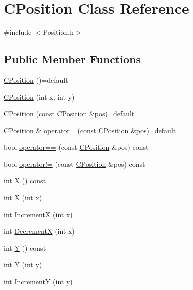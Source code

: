 \hypertarget{classCPosition}{}\section{C\+Position Class Reference}
\label{classCPosition}


{\ttfamily \#include $<$Position.\+h$>$}

\subsection*{Public Member Functions}
\begin{DoxyCompactItemize}
\item 
\hyperlink{classCPosition_a0286273b62fb1419e0e358eb4c352458}{C\+Position} ()=default
\item 
\hyperlink{classCPosition_a646b8a1a7c27e14a08becef2f61461df}{C\+Position} (int x, int y)
\item 
\hyperlink{classCPosition_afb5f1cfc928945c49d3ce88c4ab19396}{C\+Position} (const \hyperlink{classCPosition}{C\+Position} \&pos)=default
\item 
\hyperlink{classCPosition}{C\+Position} \& \hyperlink{classCPosition_ae131ec912eb7272d2bdfbdcbb7848acb}{operator=} (const \hyperlink{classCPosition}{C\+Position} \&pos)=default
\item 
bool \hyperlink{classCPosition_a301bf0382358092233b9cdd663677ee8}{operator==} (const \hyperlink{classCPosition}{C\+Position} \&pos) const
\item 
bool \hyperlink{classCPosition_ad7a23f4b734883e26de15c2487218b07}{operator!=} (const \hyperlink{classCPosition}{C\+Position} \&pos) const
\item 
int \hyperlink{classCPosition_a9a6b94d3b91df1492d166d9964c865fc}{X} () const
\item 
int \hyperlink{classCPosition_abcbbd0f2a24118ff32560150c967b1da}{X} (int x)
\item 
int \hyperlink{classCPosition_aa5955d67d5ab7ca74d80cb7303b6eaa9}{IncrementX} (int x)
\item 
int \hyperlink{classCPosition_a64f0d8ef8ca26c8b66b0997b3b132416}{DecrementX} (int x)
\item 
int \hyperlink{classCPosition_a1aa8a30e2f08dda1f797736ba8c13a87}{Y} () const
\item 
int \hyperlink{classCPosition_a182107c1ded8662afc75f876fa1b990d}{Y} (int y)
\item 
int \hyperlink{classCPosition_a3f2a26798bb27b1252ff1be303b3adfc}{IncrementY} (int y)

\end{DoxyCompactItemize}
